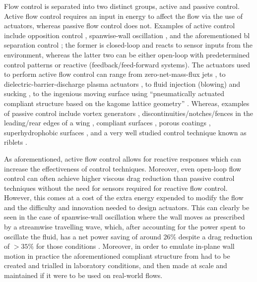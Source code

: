Flow control is separated into two distinct groups, active and passive control. Active flow control requires an input in energy to affect the flow via the use of actuators, whereas passive flow control does not. Examples of active control include opposition control \cite{choi1994,luhar2014}, spanwise-wall oscillation \cite{jung1992,choi1998,viotti2009}, and the aforementioned \gls*{bl} separation control \cite{prandtl1904}; the former is closed-loop and reacts to sensor inputs from the environment, whereas the latter two can be either open-loop with predetermined control patterns or reactive (feedback/feed-forward systems). The actuators used to perform active flow control can range from zero-net-mass-flux jets \cite{zhang2008}, to dielectric-barrier-discharge plasma actuators \cite{wang2013}, to fluid injection (blowing) and sucking \cite{chng2009}, to the ingenious moving surface using ``pneumatically actuated compliant structure based on the kagome lattice geometry'' \cite{bird2018}.
Whereas, examples of passive control include vortex generators \cite{chang1970}, discontinuities/notches/fences in the leading/rear edges of a wing \cite{chang1970}, compliant surfaces \cite{choi1997}, porous coatings \cite{klausmann2017}, superhydrophobic surfaces \cite{truesdell2006}, and a very well studied control technique known as riblets \cite{walsh1983,choi1993,garcia-mayoral2011}.

As aforementioned, active flow control allows for reactive responses which can increase the effectiveness of control techniques. Moreover, even open-loop flow control can often achieve higher viscous drag reduction than passive control techniques without the need for sensors required for reactive flow control. However, this comes at a cost of the extra energy expended to modify the flow and the difficulty and innovation needed to design actuators. This can clearly be seen in the case of spanwise-wall oscillation where the wall moves as prescribed by a streamwise travelling wave, which, after accounting for the power spent to oscillate the fluid, has a net power saving of around 26\% despite a drag reduction of $>35\%$ for those conditions \cite{quadrio2009}. Moreover, in order to emulate in-plane wall motion in practice the aforementioned compliant structure from \cite{bird2018} had to be created and trialled in laboratory conditions, and then made at scale and maintained if it were to be used on real-world flows.

